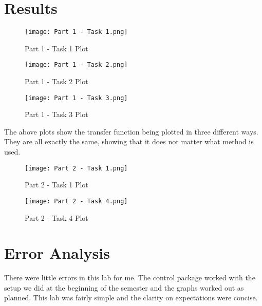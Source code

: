 \documentclass[12pt]{report}
\begin{document}
\newpage 
\section{Results}
\begin{figure}[ht]
\begin{center}
\texttt{[image: Part 1 - Task 1.png]}
\caption{Part 1 - Task 1 Plot}
\end{center}
\end{figure}

\begin{figure}[ht]
\begin{center}
\texttt{[image: Part 1 - Task 2.png]}
\caption{Part 1 - Task 2 Plot}
\end{center}
\end{figure}

\newpage 

\begin{figure}[ht]
\begin{center}
\texttt{[image: Part 1 - Task 3.png]}
\caption{Part 1 - Task 3 Plot}
\end{center}
\end{figure}

\noindent The above plots show the transfer function being plotted in three different ways. They are all exactly the same, showing that it does not matter what method is used. 

\clearpage 
\newpage 

\begin{figure}[ht]
\begin{center}
\texttt{[image: Part 2 - Task 1.png]}
\caption{Part 2 - Task 1 Plot}
\end{center}
\end{figure}

\begin{figure}[ht]
\begin{center}
\texttt{[image: Part 2 - Task 4.png]}
\caption{Part 2 - Task 4 Plot}
\end{center}
\end{figure}

\newpage 
\section{Error Analysis}
There were little errors in this lab for me. The control package worked with the setup we did at the beginning of the semester and the graphs worked out as planned. This lab was fairly simple and the clarity on expectations were concise. 
\end{document}

